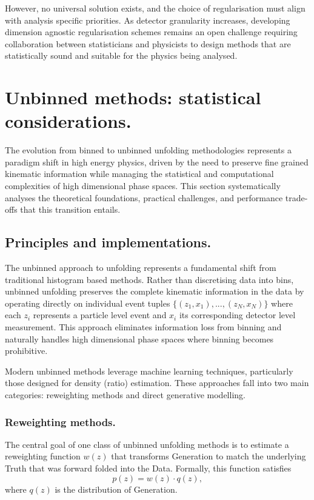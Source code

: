         However, no universal solution exists, and the choice of regularisation must align with analysis specific priorities.
        As detector granularity increases, developing dimension agnostic regularisation schemes remains an open challenge requiring collaboration between statisticians and physicists to design methods that are statistically sound and suitable for the physics being analysed.
        
\section{Unbinned methods: statistical considerations.}  
    The evolution from binned to unbinned unfolding methodologies represents a paradigm shift in high energy physics, driven by the need to preserve fine grained kinematic information while managing the statistical and computational complexities of high dimensional phase spaces.
    This section systematically analyses the theoretical foundations, practical challenges, and performance trade-offs that this transition entails.
    \subsection{Principles and implementations.}
        The unbinned approach to unfolding represents a fundamental shift from traditional histogram based methods.
        Rather than discretising data into bins, unbinned unfolding preserves the complete kinematic information in the data by operating directly on individual event tuples \(\{(z_1, x_1), ..., (z_N, x_N)\}\) where each \(z_i\) represents a particle level event and \(x_i\) its corresponding detector level measurement.
        This approach eliminates information loss from binning and naturally handles high dimensional phase spaces where binning becomes prohibitive.

        

        Modern unbinned methods leverage machine learning techniques, particularly those designed for density (ratio) estimation.
        These approaches fall into two main categories: reweighting methods and direct generative modelling.
        \subsubsection{Reweighting methods.}
            The central goal of one class of unbinned unfolding methods is to estimate a reweighting function \(w(z)\) that transforms Generation to match the underlying Truth that was forward folded into the Data.
            Formally, this function satisfies
            \begin{equation}
                p(z) = w(z) \cdot q(z),
            \end{equation}
            where \(q(z)\) is the distribution of Generation.
        
